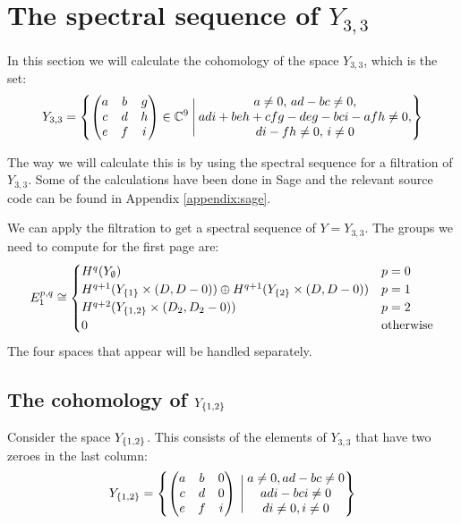 \section{The spectral sequence of $Y_{3,3}$}
\label{sec:ss33}


In this section we will calculate the cohomology of the space
$Y_{3,3}$, which is the set:
\[ Y_{3,3} = \left\{ 
  \begin{pmatrix}
    a & b & g \\
    c & d & h \\
    e & f & i
  \end{pmatrix} \in \mathbb{C}^9 \:\Bigg\vert\: 
  \begin{matrix}
    a\neq 0,\, ad-bc \neq 0, \\
    adi+beh+cfg-deg-bci-afh \neq 0, \\
    di-fh \neq 0,\, i \neq 0
  \end{matrix}  \right\} \]

The way we will calculate this is by using the spectral sequence for
a filtration of $Y_{3,3}$. Some of the calculations have
been done in Sage and the relevant source code can be found in
Appendix \ref{appendix:sage}.


We can apply the filtration to get a spectral sequence of
$Y=Y_{3,3}$. The groups we need to compute for the first page are:
\[ E_1^{p,q} \cong
\begin{cases}
  H^{q}(Y_\emptyset) & p=0 \\
  H^{q+1}(Y_{\left\{ 1 \right\}} \times (D,D-0)) \oplus H^{q+1}(Y_{\left\{ 2 \right\}} \times
  (D,D-0)) & p=1 \\
  H^{q+2}(Y_{\left\{ 1,2 \right\}}\times (D_2,D_2-0)) & p = 2 \\
  0 & \text{otherwise}
\end{cases} \]
The four spaces that appear will be handled separately.

\subsection{The cohomology of $Y_{\left\{ 1,2 \right\}}$}

Consider the space $Y_{\left\{ 1,2 \right\}}$. This consists of the elements of
$Y_{3,3}$ that have two zeroes in the last column:
\[ Y_{\left\{ 1,2 \right\}} = \left\{ 
  \begin{pmatrix}
    a & b & 0 \\
    c & d & 0 \\
    e & f & i
  \end{pmatrix} \:\Bigg\vert\:
  \begin{matrix}
    a \neq 0, ad-bc \neq 0 \\
    adi-bci \neq 0 \\
    di \neq 0, i \neq 0
  \end{matrix}
 \right\} \]

